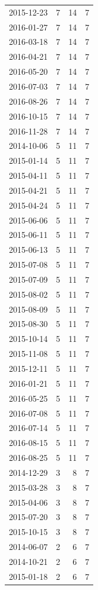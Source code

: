 \begin{tabular}{lrrr}
2015-12-23 & 7 & 14 & 7 \\
2016-01-27 & 7 & 14 & 7 \\
2016-03-18 & 7 & 14 & 7 \\
2016-04-21 & 7 & 14 & 7 \\
2016-05-20 & 7 & 14 & 7 \\
2016-07-03 & 7 & 14 & 7 \\
2016-08-26 & 7 & 14 & 7 \\
2016-10-15 & 7 & 14 & 7 \\
2016-11-28 & 7 & 14 & 7 \\
2014-10-06 & 5 & 11 & 7 \\
2015-01-14 & 5 & 11 & 7 \\
2015-04-11 & 5 & 11 & 7 \\
2015-04-21 & 5 & 11 & 7 \\
2015-04-24 & 5 & 11 & 7 \\
2015-06-06 & 5 & 11 & 7 \\
2015-06-11 & 5 & 11 & 7 \\
2015-06-13 & 5 & 11 & 7 \\
2015-07-08 & 5 & 11 & 7 \\
2015-07-09 & 5 & 11 & 7 \\
2015-08-02 & 5 & 11 & 7 \\
2015-08-09 & 5 & 11 & 7 \\
2015-08-30 & 5 & 11 & 7 \\
2015-10-14 & 5 & 11 & 7 \\
2015-11-08 & 5 & 11 & 7 \\
2015-12-11 & 5 & 11 & 7 \\
2016-01-21 & 5 & 11 & 7 \\
2016-05-25 & 5 & 11 & 7 \\
2016-07-08 & 5 & 11 & 7 \\
2016-07-14 & 5 & 11 & 7 \\
2016-08-15 & 5 & 11 & 7 \\
2016-08-25 & 5 & 11 & 7 \\
2014-12-29 & 3 & 8 & 7 \\
2015-03-28 & 3 & 8 & 7 \\
2015-04-06 & 3 & 8 & 7 \\
2015-07-20 & 3 & 8 & 7 \\
2015-10-15 & 3 & 8 & 7 \\
2014-06-07 & 2 & 6 & 7 \\
2014-10-21 & 2 & 6 & 7 \\
2015-01-18 & 2 & 6 & 7 \\

\end{tabular}
